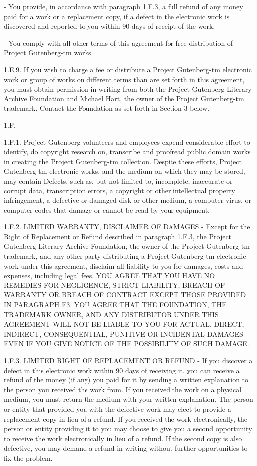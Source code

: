 \documentclass{article}
\begin{document}
- You provide, in accordance with paragraph 1.F.3, a full refund of any
     money paid for a work or a replacement copy, if a defect in the
     electronic work is discovered and reported to you within 90 days
     of receipt of the work.

- You comply with all other terms of this agreement for free
     distribution of Project Gutenberg-tm works.

1.E.9.  If you wish to charge a fee or distribute a Project Gutenberg-tm
electronic work or group of works on different terms than are set
forth in this agreement, you must obtain permission in writing from
both the Project Gutenberg Literary Archive Foundation and Michael
Hart, the owner of the Project Gutenberg-tm trademark.  Contact the
Foundation as set forth in Section 3 below.

1.F.

1.F.1.  Project Gutenberg volunteers and employees expend considerable
effort to identify, do copyright research on, transcribe and proofread
public domain works in creating the Project Gutenberg-tm
collection.  Despite these efforts, Project Gutenberg-tm electronic
works, and the medium on which they may be stored, may contain
Defects, such as, but not limited to, incomplete, inaccurate or
corrupt data, transcription errors, a copyright or other intellectual
property infringement, a defective or damaged disk or other medium, a
computer virus, or computer codes that damage or cannot be read by
your equipment.

1.F.2.  LIMITED WARRANTY, DISCLAIMER OF DAMAGES - Except for the Right
of Replacement or Refund described in paragraph 1.F.3, the Project
Gutenberg Literary Archive Foundation, the owner of the Project
Gutenberg-tm trademark, and any other party distributing a Project
Gutenberg-tm electronic work under this agreement, disclaim all
liability to you for damages, costs and expenses, including legal
fees.  YOU AGREE THAT YOU HAVE NO REMEDIES FOR NEGLIGENCE, STRICT
LIABILITY, BREACH OF WARRANTY OR BREACH OF CONTRACT EXCEPT THOSE
PROVIDED IN PARAGRAPH F3.  YOU AGREE THAT THE FOUNDATION, THE
TRADEMARK OWNER, AND ANY DISTRIBUTOR UNDER THIS AGREEMENT WILL NOT BE
LIABLE TO YOU FOR ACTUAL, DIRECT, INDIRECT, CONSEQUENTIAL, PUNITIVE OR
INCIDENTAL DAMAGES EVEN IF YOU GIVE NOTICE OF THE POSSIBILITY OF SUCH
DAMAGE.

1.F.3.  LIMITED RIGHT OF REPLACEMENT OR REFUND - If you discover a
defect in this electronic work within 90 days of receiving it, you can
receive a refund of the money (if any) you paid for it by sending a
written explanation to the person you received the work from.  If you
received the work on a physical medium, you must return the medium with
your written explanation.  The person or entity that provided you with
the defective work may elect to provide a replacement copy in lieu of a
refund.  If you received the work electronically, the person or entity
providing it to you may choose to give you a second opportunity to
receive the work electronically in lieu of a refund.  If the second copy
is also defective, you may demand a refund in writing without further
opportunities to fix the problem.
\end{document}
